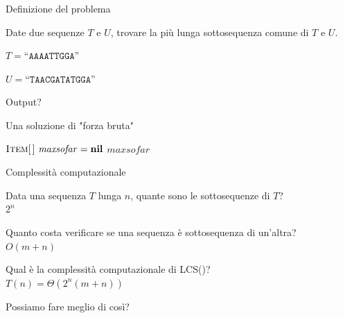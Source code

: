 \begin{frame}{Definizione del problema}

\vspace{-9pt}
\begin{myboxtitle}
Date due sequenze $T$ e $U$, trovare la più lunga sottosequenza comune di $T$ e $U$.
\end{myboxtitle}

\begin{myboxtitle}[Esempio]
\BIL
\item $T = \texttt{“AAAATTGGA”}$
\item $U = \texttt{“TAACGATATGGA”}$
\item Output?
\EIL
\end{myboxtitle}


\end{frame}

\begin{frame}[shrink=5]{Una soluzione di "forza bruta"}
  
\vspace{-9pt}
\begin{Procedure}
\caption[A]{\INTEGER\ ($\Item[\,]\ T$, $\Item[\,]\ U$)}

  $\textsc{Item}[\,]\ \mathit{maxsofar} = \textbf{nil}$\;
  \Return $\mathit{maxsofar}$\;
\end{Procedure}
  
\end{frame}


\begin{frame}{Complessità computazionale}

\vspace{-9pt}
\BIL
\item Data una sequenza $T$ lunga $n$, quante sono le sottosequenze di
$T$?\\ \pause \alert{$2^n$}
\item Quanto costa verificare se una sequenza è sottosequenza di un'altra?\\
\pause \alert{$O(m+n)$}
\item Qual è la complessità computazionale di \textsf{LCS()}?\\
\pause \alert{$T(n) = \Theta(2^n(m+n))$}
\item Possiamo fare meglio di così?
\EIL

\end{frame}

